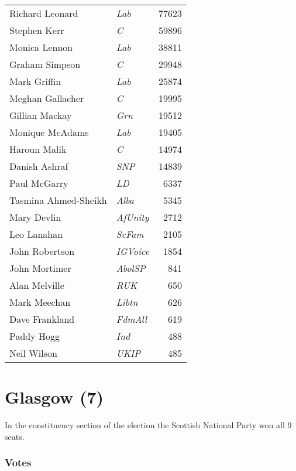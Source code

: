 {\footnotesize
\begin{tabular*}{\columnwidth}{@{\extracolsep{\fill}} p{} >{\itshape}l r @{\extracolsep{\fill}}}
	Richard Leonard & Lab & 77623\\%
	Stephen Kerr & C & 59896\\%
	Monica Lennon & Lab & 38811\\%
	Graham Simpson & C & 29948\\%
	Mark Griffin & Lab & 25874\\%
	Meghan Gallacher & C & 19995\\%
	Gillian Mackay & Grn & 19512\\%
	\hline
	Monique McAdams & Lab & 19405\\
	Haroun Malik & C & 14974\\
	Danish Ashraf & SNP & 14839\\
	Paul McGarry & LD & 6337\\
	Tasmina Ahmed-Sheikh & Alba & 5345\\
	Mary Devlin & AfUnity & 2712\\
	Leo Lanahan & ScFam & 2105\\
	John Robertson & IGVoice & 1854\\
	John Mortimer & AbolSP & 841\\
	Alan Melville & RUK & 650\\
	Mark Meechan & Libtn & 626\\
	Dave Frankland & FdmAll & 619\\
	Paddy Hogg & Ind & 488\\
	Neil Wilson & UKIP & 485\\
\end{tabular*}

}

\section[Glasgow]{Glasgow (7)}

In the constituency section of the election the Scottish National Party won all 9 seats.

\subsubsection*{Votes}

